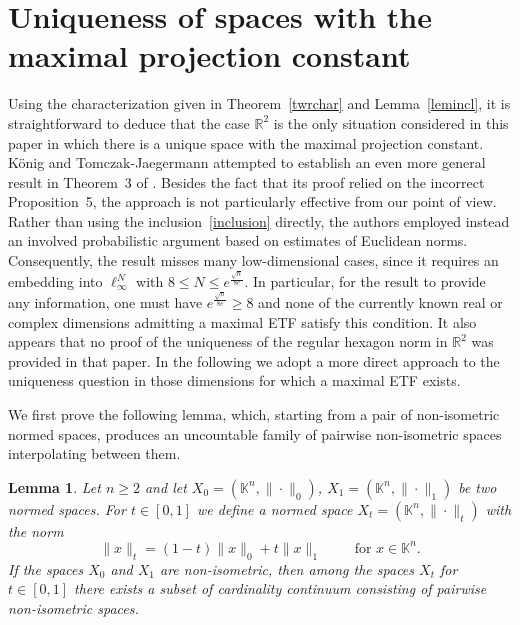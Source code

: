 \documentclass[12pt, reqno]{amsart}
\newtheorem{lem}[twr]{Lemma}
\theoremstyle{definition}
\theoremstyle{remark}
\numberwithin{equation}{section}
\begin{document}
\section{Uniqueness of spaces with the maximal projection constant}


Using the characterization given in Theorem~\ref{twrchar} and Lemma~\ref{lemincl}, it is straightforward to deduce that the case $\mathbb{R}^2$ is the only situation considered in this paper in which there is a unique space with the maximal projection constant. K\"onig and Tomczak-Jaegermann attempted to establish an even more general result in Theorem~3 of \cite{konigtomczak2}. Besides the fact that its proof relied on the incorrect Proposition~5, the approach is not particularly effective from our point of view. Rather than using the inclusion~\eqref{inclusion} directly, the authors employed instead an involved probabilistic argument based on estimates of Euclidean norms. Consequently, the result misses many low-dimensional cases, since it requires an embedding into $\ell_\infty^N$ with $8 \leq N \leq e^{\frac{\sqrt{n}}{8e}}$. In particular, for the result to provide any information, one must have $e^{\frac{\sqrt{n}}{8e}} \geq 8$ and none of the currently known real or complex dimensions admitting a maximal ETF satisfy this condition. It also appears that no proof of the uniqueness of the regular hexagon norm in $\mathbb{R}^2$ was provided in that paper. In the following we adopt a more direct approach to the uniqueness question in those dimensions for which a maximal ETF exists.

We first prove the following lemma, which, starting from a pair of non-isometric normed spaces, produces an uncountable family of pairwise non-isometric spaces interpolating between them.

\begin{lem}
\label{lemisometric}
Let $n \geq 2$ and let $X_0 = (\mathbb{K}^n, \| \cdot\|_0)$, $X_1=(\mathbb{K}^n, \| \cdot\|_1)$ be two normed spaces. For $t \in [0, 1]$ we define a normed space $X_t = (\mathbb{K}^n, \| \cdot \|_t)$ with the norm
$$\|x\|_t = (1-t)\|x\|_0 + t\|x\|_1 \qquad \text{ for } x \in \mathbb{K}^n.$$
If the spaces $X_0$ and $X_1$ are non-isometric, then among the spaces $X_t$ for $t\in[0,1]$ there exists a subset of cardinality continuum consisting of pairwise non-isometric spaces.
\end{lem}
\end{document}
